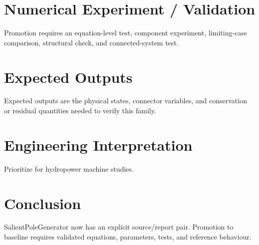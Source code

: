 \documentclass[10pt,a4paper]{article}
\begin{document}
\section{Numerical Experiment / Validation}Promotion requires an equation-level test, component experiment, limiting-case comparison, structural check, and connected-system test.
\section{Expected Outputs}Expected outputs are the physical states, connector variables, and conservation or residual quantities needed to verify this family.
\section{Engineering Interpretation}Prioritize for hydropower machine studies.
\section*{Conclusion}SalientPoleGenerator now has an explicit source/report pair. Promotion to baseline requires validated equations, parameters, tests, and reference behaviour.
\end{document}
